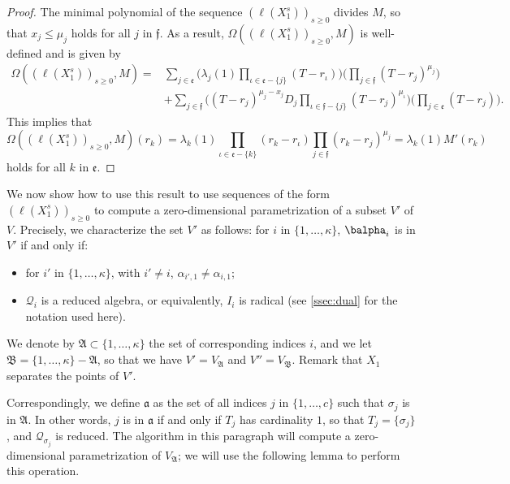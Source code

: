 \documentclass[12pt]{article}
\newcommand{\residueI}{\mathscr{Q}}
\def\dg{\kappa}
\begin{document}
\begin{proof}

        The minimal polynomial of the sequence $(\ell(X_1^s))_{s \ge
          0}$ divides $M$, so that $x_j \le \mu_j$ holds for all $j$
        in $\mathfrak{f}$.  As a result,
        $\Omega((\ell(X_1^s))_{s\ge0},M)$ is well-defined and is given by
	\begin{align*}
	\Omega((\ell(X_1^s))_{s\ge0},M)=&
	\sum_{j \in \mathfrak{e}}
	\Big(
	\lambda_j(1) \prod_{\iota \in \mathfrak{e}-\{j\}}(T-r_\iota)\Big)
	\Big(\prod_{j \in \mathfrak{f}}(T-r_j)^{\mu_j} \Big)\\
	&+
	\sum_{j\in \mathfrak{f}}
	\Big(  (T-r_j)^{\mu_j-x_j} D_j
	\prod_{\iota \in \mathfrak{f}-\{j\}}(T-r_j)^{\mu_\iota}\Big)
	\Big(\prod_{j\in \mathfrak{e}} (T-r_j) \Big).
	\end{align*}
	This implies that $$\Omega((\ell(X_1^s))_{s\ge0},M)(r_k) =\lambda_k(1) 
	\prod_{\iota \in \mathfrak{e}-\{k\}}(r_k-r_\iota)
	\prod_{j \in \mathfrak{f}}(r_k-r_j)^{\mu_j} = \lambda_k(1) M'(r_k)$$ 
	holds for all $k$ in $\mathfrak{e}$.
\end{proof}

We now show how to use this result to use sequences of the form
$(\ell(X_1^s))_{s \ge 0}$ to compute a zero-dimensional
parametrization of a subset $V'$ of $V$. Precisely, we characterize
the set $V'$ as follows: for $i$ in $\{1,\dots,\dg\}$, $\balpha_i$ is in
$V'$ if and only if:
\begin{itemize}
	\item for $i'$ in $\{1,\dots,\dg\}$, with $i'\ne i$, $\alpha_{i',1} \ne
	\alpha_{i,1}$;
	\item $\residueI_i$ is a reduced algebra, or equivalently, $I_i$ is radical (see \cref{ssec:dual} 
          for the notation used here).
\end{itemize}
We denote by $\mathfrak{A}\subset \{1,\dots,\dg\}$ the set of
corresponding indices $i$, and we let
$\mathfrak{B}=\{1,\dots,\dg\}-\mathfrak{A}$, so that we have
$V'=V_{\mathfrak{A}}$ and $V''=V_{\mathfrak{B}}$.  Remark that $X_1$
separates the points of $V'$.

Correspondingly, we define $\mathfrak{a}$ as the set of all indices
$j$ in $\{1,\dots,c\}$ such that $\sigma_j$ is in $\mathfrak{A}$. In
other words, $j$ is in $\mathfrak{a}$ if and only if $T_j$ has
cardinality $1$, so that $T_j=\{\sigma_j\}$, and
$\residueI_{\sigma_j}$ is reduced.  The algorithm in this paragraph
will compute a zero-dimensional parametrization of $V_{\mathfrak{A}}$;
we will use the following lemma to perform this operation.
\end{document}
